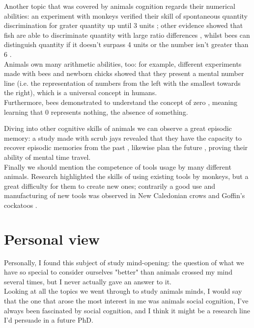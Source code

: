 Another topic that was covered by animals cognition regards their numerical abilities: an experiment with monkeys verified their skill of spontaneous quantity discrimination for grater quantity up until 3 units \parencite{Hauser_2000}; other evidence showed that fish  are able to discriminate quantity with large ratio differences \parencite{Agrillo_2008}, whilst bees can distinguish quantity if it doesn't surpass 4 units or the number isn't greater than 6 \parencite{Gross_2009}. \\
Animals own many arithmetic abilities, too: for example, different experiments made with bees \parencite{Giurfa_2022} and newborn chicks \parencite{Rugani_2015} showed that they present a mental number line (i.e. the representation of numbers from the left with the smallest towards the right), which is a universal concept in humans. \\
Furthermore, bees demonstrated to understand the concept of zero \parencite{Howard_2018}, meaning learning that 0 represents nothing, the absence of something.

Diving into other cognitive skills of animals we can observe a great episodic memory: a study made with scrub jays revealed that they have the capacity to recover episodic memories from the past \parencite{Clayton_1998}, likewise plan the future \parencite{Caroline_2007}, proving their ability of mental time travel. \\
Finally we should mention the competence of tools usage by many different animals. Research highlighted the skills of using existing tools by monkeys, but a great difficulty for them to create new ones; contrarily a good use and manufacturing of new tools was observed in New Caledonian crows and Goffin's cockatoos \parencite{Auersperg_2016,Rutz_2016}.  

\section*{Personal view}
Personally, I found this subject of study mind-opening: the question of what we have so special to consider ourselves "better" than animals crossed my mind several times, but I never actually gave an answer to it. \\
Looking at all the topics we went through to study animals minds, I would say that the one that arose the most interest in me was animals social cognition, I've always been fascinated by social cognition, and I think it might be a research line I'd persuade in a future PhD. 


